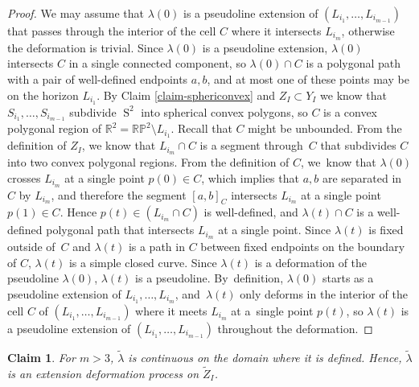 \documentclass[11pt]{article}
\numberwithin{equation}{section}
\newtheorem{claim}[theorem]{Claim}
\theoremstyle{remark}
\let\mb\mathbb
\DeclareMathOperator{\sphere}{S}
\newcommand{\projplane}{\mb{RP}^2}
\begin{document}
\begin{proof}
We may assume that $\lambda(0)$ is a pseudoline extension of $(L_{i_1},\dots,L_{i_{m-1}})$ that passes through the interior of the cell $C$ where it intersects $L_{i_m}$, otherwise the deformation is trivial.
Since $\lambda(0)$ is a pseudoline extension, $\lambda(0)$ intersects $C$ in a single connected component, so $\lambda(0) \cap C$ is a polygonal path with a pair of well-defined endpoints $a,b$, and at most one of these points may be on the horizon $L_{i_1}$.
By Claim \ref{claim-sphericonvex} and $Z_I \subset Y_I$ we know that $S_{i_1},\dots,S_{i_{m-1}}$ subdivide $\sphere^2$ into spherical convex polygons, so $C$ is a convex polygonal region of $\mb{R}^2 = \projplane \setminus L_{i_1}$. Recall that $C$ might be unbounded.
From the definition of $Z_I$, we know that $L_{i_m} \cap C$ is a segment through~$C$ that subdivides $C$ into two convex polygonal regions.
From the definition of $C$, we~know that $\lambda(0)$ crosses $L_{i_m}$ at a single point $p(0) \in C$, which implies that $a,b$ are separated in $C$ by $L_{i_m}$, and therefore the segment $[a,b]_{C}$ intersects $L_{i_m}$ at a single point $p(1) \in C$.
Hence $p(t) \in (L_{i_m} \cap C)$ is well-defined, and $\lambda(t) \cap C$ is a well-defined polygonal path that intersects $L_{i_m}$ at a single point. Since $\lambda(t)$ is fixed outside of~$C$ and $\lambda(t)$ is a path in $C$ between fixed endpoints on the boundary of $C$, $\lambda(t)$ is a simple closed curve. Since $\lambda(t)$ is a deformation of the pseudoline $\lambda(0)$, $\lambda(t)$ is a pseudoline.
By~definition, $\lambda(0)$ starts as a pseudoline extension of $L_{i_1},\dots,L_{i_m}$, and~$\lambda(t)$ only deforms in the interior of the cell $C$ of $(L_{i_1},\dots,L_{i_{m-1}})$ where it meets $L_{i_m}$ at a~single point $p(t)$, so $\lambda(t)$ is a pseudoline extension of $(L_{i_1},\dots,L_{i_{m-1}})$ throughout the deformation.
\end{proof}

\begin{claim}\label{claim-lambda-continuous}
For $m >3$, $\tilde \lambda$ is continuous on the domain where it is defined. Hence, $\tilde \lambda$ is an extension deformation process on $\tilde Z_I$.
\end{claim}
\end{document}
